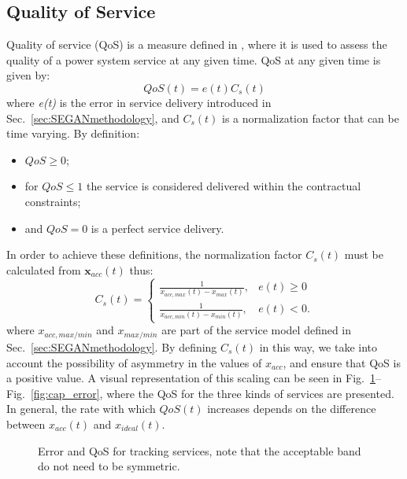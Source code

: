 \subsection{Quality of Service}
Quality of service (QoS) is a measure defined in \cite{bondy2014performance}, where it is used to assess the quality of a power system service at any given time. QoS at any given time is given by:
\begin{equation}\label{eq:QoS}
QoS(t)=e(t)C_{s}(t)
\end{equation}
where \emph{e(t)} is the error in service delivery introduced in Sec.~\ref{sec:SEGANmethodology}, and $C_s(t)$ is a normalization factor that can be time varying. By definition:
\begin{itemize}
\item $QoS \geq 0$;
\item for $QoS \leq 1$ the service is considered delivered within the contractual constraints;
\item and $QoS = 0$ is a perfect service delivery.
\end{itemize}
In order to achieve these definitions, the normalization factor $C_{s}(t)$ must be calculated from $\mathbf{x}_{acc}(t)$ thus:
\begin{equation}
C_{s}(t) = 
\begin{cases}
\frac{1}{x_{acc,max}(t) - x_{max}(t)}, & e(t) \geq 0 \\
\frac{1}{x_{acc,min}(t) - x_{min}(t)}, & e(t) < 0.
\end{cases}\label{eq:cst}
\end{equation}
where $x_{acc,max/min}$ and $x_{max/min}$ are part of the service model defined in Sec.~\ref{sec:SEGANmethodology}. By defining $C_{s}(t)$ in this way, we take into account the possibility of asymmetry in the values of $x_{acc}$, and ensure that QoS is a positive value. A visual representation of this scaling can be seen in Fig.~\ref{fig:tracking_error}--Fig.~\ref{fig:cap_error}, where the QoS for the three kinds of services are presented.
In general, the rate with which $QoS(t)$ increases depends on the difference between $x_{acc}(t)$ and $x_{ideal}(t)$.
\begin{figure}
\centering
{} 
\caption{Error and QoS for tracking services, note that the acceptable band do not need to be symmetric.}
\label{fig:tracking_error}
\end{figure}
